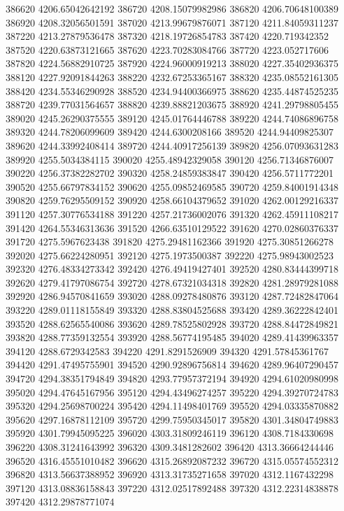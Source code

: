 {386620 4206.65042642192
386720 4208.15079982986
386820 4206.70648100389
386920 4208.32056501591
387020 4213.99679876071
387120 4211.84059311237
387220 4213.27879536478
387320 4218.19726854783
387420 4220.719342352
387520 4220.63873121665
387620 4223.70283084766
387720 4223.052717606
387820 4224.56882910725
387920 4224.96000919213
388020 4227.35402936375
388120 4227.92091844263
388220 4232.67253365167
388320 4235.08552161305
388420 4234.55346290928
388520 4234.94400366975
388620 4235.44874525235
388720 4239.77031564657
388820 4239.88821203675
388920 4241.29798805455
389020 4245.26290375555
389120 4245.01764446788
389220 4244.74086896758
389320 4244.78206099609
389420 4244.6300208166
389520 4244.94409825307
389620 4244.33992408414
389720 4244.40917256139
389820 4256.07093631283
389920 4255.5034384115
390020 4255.48942329058
390120 4256.71346876007
390220 4256.37382282702
390320 4258.24859383847
390420 4256.5711772201
390520 4255.66797834152
390620 4255.09852469585
390720 4259.84001914348
390820 4259.76295509152
390920 4258.66104379652
391020 4262.00129216337
391120 4257.30776534188
391220 4257.21736002076
391320 4262.45911108217
391420 4264.55346313636
391520 4266.63510129522
391620 4270.02860376337
391720 4275.5967623438
391820 4275.29481162366
391920 4275.30851266278
392020 4275.66224280951
392120 4275.1973500387
392220 4275.98943002523
392320 4276.48334273342
392420 4276.49419427401
392520 4280.83444399718
392620 4279.41797086754
392720 4278.67321034318
392820 4281.28979281088
392920 4286.94570841659
393020 4288.09278480876
393120 4287.72482847064
393220 4289.01118155849
393320 4288.83804525688
393420 4289.36222842401
393520 4288.62565540086
393620 4289.78525802928
393720 4288.84472849821
393820 4288.77359132554
393920 4288.56774195485
394020 4289.41439963357
394120 4288.6729342583
394220 4291.8291526909
394320 4291.57845361767
394420 4291.47495755901
394520 4290.92896756814
394620 4289.96407290457
394720 4294.38351794849
394820 4293.77957372194
394920 4294.61020980998
395020 4294.47645167956
395120 4294.43496274257
395220 4294.39270724783
395320 4294.25698700224
395420 4294.11498401769
395520 4294.03335870882
395620 4297.16878112109
395720 4299.75950345017
395820 4301.34804749883
395920 4301.79945095225
396020 4303.31809246119
396120 4308.7184330698
396220 4308.31241643992
396320 4309.3481282602
396420 4313.36664244446
396520 4316.45551010482
396620 4315.26892087232
396720 4315.05574552312
396820 4313.56637388952
396920 4313.31735271658
397020 4312.1167432298
397120 4313.08836158843
397220 4312.02517892488
397320 4312.22314838878
397420 4312.29878771074
}
